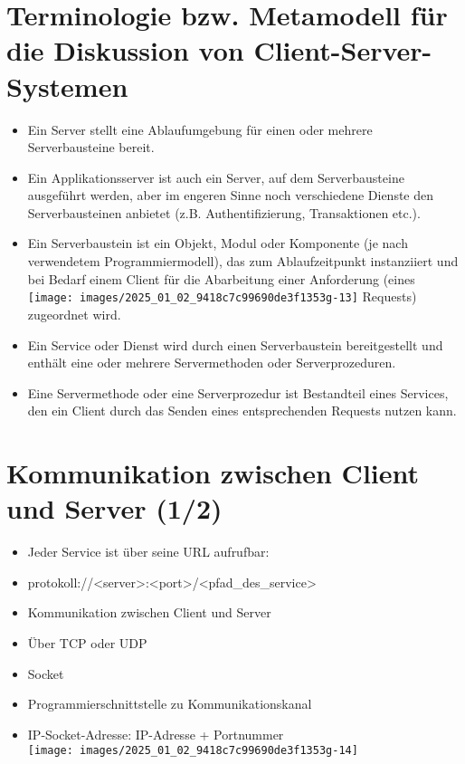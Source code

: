 \documentclass[10pt]{article}
\begin{document}
\section*{Terminologie bzw. Metamodell für die Diskussion von Client-Server-Systemen}
\begin{itemize}
  \item Ein Server stellt eine Ablaufumgebung für einen oder mehrere Serverbausteine bereit.
  \item Ein Applikationsserver ist auch ein Server, auf dem Serverbausteine ausgeführt werden, aber im engeren Sinne noch verschiedene Dienste den Serverbausteinen anbietet (z.B. Authentifizierung, Transaktionen etc.).
  \item Ein Serverbaustein ist ein Objekt, Modul oder Komponente (je nach verwendetem Programmiermodell), das zum Ablaufzeitpunkt instanziiert und bei Bedarf einem Client für die Abarbeitung einer Anforderung (eines\\
\texttt{[image: images/2025\_01\_02\_9418c7c99690de3f1353g-13]} Requests) zugeordnet wird.
  \item Ein Service oder Dienst wird durch einen Serverbaustein bereitgestellt und enthält eine oder mehrere Servermethoden oder Serverprozeduren.
  \item Eine Servermethode oder eine Serverprozedur ist Bestandteil eines Services, den ein Client durch das Senden eines entsprechenden Requests nutzen kann.
\end{itemize}

\section*{Kommunikation zwischen Client und Server (1/2)}
\begin{itemize}
  \item Jeder Service ist über seine URL aufrufbar:
  \item protokoll://<server>:<port>/<pfad\_des\_service>
  \item Kommunikation zwischen Client und Server
  \item Über TCP oder UDP
  \item Socket
  \item Programmierschnittstelle zu Kommunikationskanal
  \item IP-Socket-Adresse: IP-Adresse + Portnummer\\
\texttt{[image: images/2025\_01\_02\_9418c7c99690de3f1353g-14]}
\end{itemize}
\end{document}
